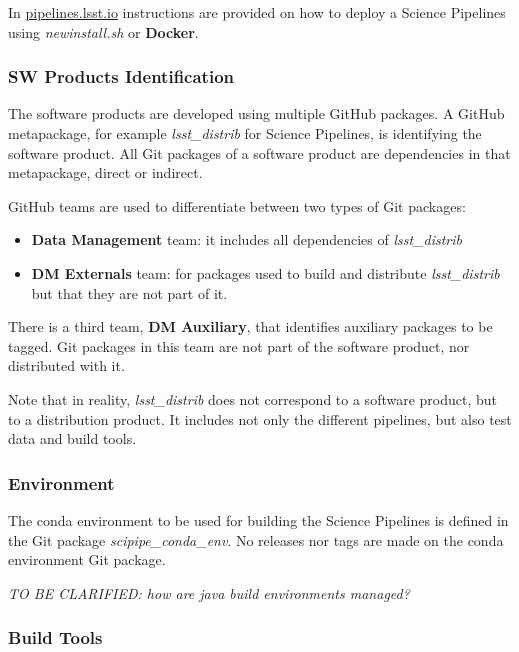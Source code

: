 In \url{pipelines.lsst.io} instructions are provided on how to deploy a Science Pipelines using \textit{newinstall.sh} or \textbf{Docker}.


\subsubsection{SW Products Identification} \label{sec:statusIdentification}

The software products are developed using multiple GitHub packages. 
A GitHub metapackage, for example \textit{lsst\_distrib} for Science Pipelines, is identifying the software product. 
All Git packages of a software product are dependencies in that metapackage, direct or indirect.

GitHub teams are used to differentiate between two types of Git packages:

\begin{itemize}
\item \textbf{Data Management} team: it includes all dependencies of \textit{lsst\_distrib}
\item \textbf{DM Externals} team: for packages used to build and distribute \textit{lsst\_distrib} but that they are not part of it.
\end{itemize}

There is a third team, \textbf{DM Auxiliary}, that identifies auxiliary packages to be tagged.
Git packages in this team are not part of the software product, nor distributed with it.

Note that in reality, \textit{lsst\_distrib} does not correspond to a software product, but to a distribution product.
It includes not only the different pipelines, but also test data and build tools.


\subsubsection{Environment} \label{sec:statusEnvs}

The conda environment to be used for building the Science Pipelines is defined in the Git package \textit{scipipe\_conda\_env}.
No releases nor tags are made  on the conda environment Git package.

\textit{TO BE CLARIFIED: how are java build environments managed?}


\subsubsection{Build Tools} \label{sec:statusTools}

